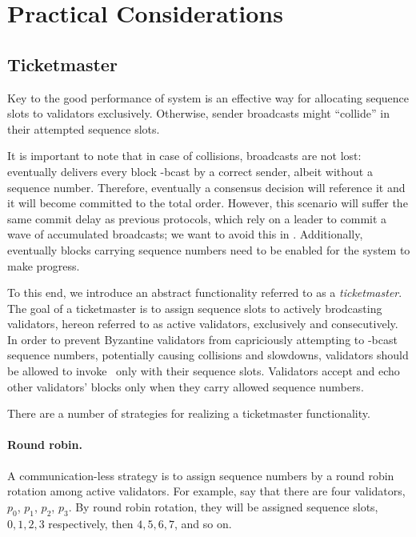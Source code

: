 \section{Practical Considerations}

\subsection{Ticketmaster}
\label{sec:ticketmaster}

Key to the good performance of system is an effective way for allocating sequence slots to validators exclusively.
Otherwise, sender broadcasts might ``collide'' in their attempted sequence slots.

It is important to note that in case of collisions, broadcasts are not lost:
\primitive eventually delivers every block \primitivesmall-bcast by a correct sender, albeit without a sequence number. Therefore, eventually a consensus decision will reference it and it will become committed to the total order.  
However, this scenario will suffer the same commit delay as previous protocols, which rely on a leader to commit a wave of accumulated broadcasts; we want to avoid this in \system.
Additionally, eventually blocks carrying sequence numbers need to be enabled for the system to make progress.

To this end, we introduce an abstract functionality referred to as a \emph{ticketmaster}.
The goal of a ticketmaster is to assign sequence slots to actively brodcasting validators, hereon referred to as active validators, exclusively and consecutively.
In order to prevent Byzantine validators from capriciously attempting to \primitivesmall-bcast sequence numbers,
potentially causing collisions and slowdowns,
validators should be allowed to invoke \bbcacast\ only with their sequence slots. 
Validators accept and echo other validators' blocks only when they carry allowed sequence numbers.

There are a number of strategies for realizing a ticketmaster functionality.

\paragraph{Round robin.}
A communication-less strategy is to assign sequence numbers by a round robin rotation among active validators.
For example, say that there are four validators, $p_0$, $p_1$, $p_2$, $p_3$.
By round robin rotation, they will be assigned sequence slots, $0, 1, 2, 3$ respectively, then $4, 5, 6, 7$, and so on.

